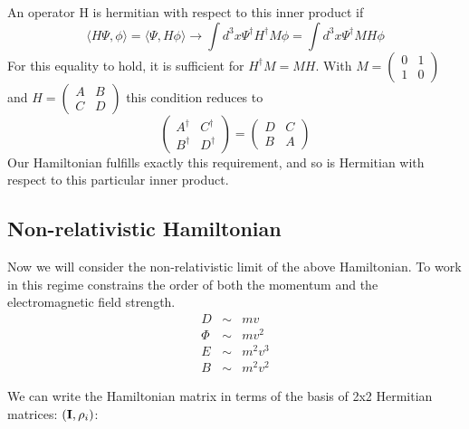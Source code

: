 An operator H is hermitian with respect to this inner product if
\[ \langle H\Psi, \phi \rangle = \langle \Psi, H\phi \rangle \to
		\int d^3x \Psi^\dagger H^\dagger M \phi	=	\int d^3x \Psi^\dagger M H \phi
\]
For this equality to hold, it is sufficient for $H^\dagger M = M H$.  With $M=\begin{pmatrix} 0 & 1 \\ 1 & 0 \end{pmatrix}$ and $H=\begin{pmatrix} A & B \\ C & D \end{pmatrix}$ this condition reduces to 
\[
	\begin{pmatrix} A^\dagger & C^\dagger \\ B^\dagger & D^\dagger \end{pmatrix}
	=\begin{pmatrix} D & C \\ B & A \end{pmatrix}
\]
Our Hamiltonian fulfills exactly this requirement, and so is Hermitian with respect to this particular inner product.



\subsection{Non-relativistic Hamiltonian}
Now we will consider the non-relativistic limit of the above Hamiltonian.  To work in this regime constrains the order of both the momentum and the electromagnetic field strength.
\begin{eqnarray*}
	D	&\sim&	mv	\\
	\Phi	&\sim&	mv^2	\\
	E	&\sim&	m^2v^3	\\
	B	&\sim&	m^2v^2
\end{eqnarray*}

We can write the Hamiltonian matrix in terms of the basis of 2x2 Hermitian matrices: $({\bf I}, \rho_i)$:


